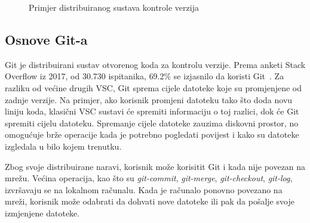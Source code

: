 \begin{figure}[h]

    \caption{Primjer distribuiranog sustava kontrole verzija}%
    \label{fig:02DVCS}
\end{figure}

\subsection{Osnove Git-a}
Git je distribuirani sustav otvorenog koda za kontrolu verzije. Prema anketi Stack Overflow iz 2017,
od 30.730 ispitanika, 69.2\% se izjasnilo da koristi Git~\citep{StackOverflow2017Survey}. Za razliku
od većine drugih VSC, Git sprema cijele datoteke koje su promjenjene od zadnje verzije. Na primjer,
ako korisnik promjeni datoteku tako što doda novu liniju koda, klasični VSC sustavi će spremiti
informaciju o toj razlici, dok će Git spremiti cijelu datoteku. Spremanje cijele datoteke zauzima
diskovni prostor, no omogućuje brže operacije kada je potrebno pogledati povijest i kako su datoteke
izgledala u bilo kojem trenutku.

Zbog svoje distribuirane naravi, korisnik može korisitit Git i kada nije povezan na mrežu. Većina
operacija, kao što su \textit{git-commit}, \textit{git-merge}, \textit{git-checkout},
\textit{git-log}, izvršavaju se na lokalnom računalu. Kada je računalo ponovno povezano na mreži,
korisnik može odabrati da dohvati nove datoteke ili pak da pošalje svoje izmjenjene datoteke.

